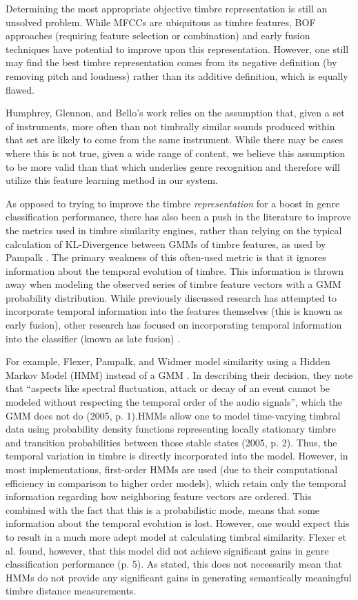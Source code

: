 \documentclass[a4paper,12pt]{report} 	%
\numberwithin{figure}{chapter}
\numberwithin{table}{chapter}
\numberwithin{equation}{chapter}
\begin{document}
\begin{flushleft}
Determining the most appropriate objective timbre representation is still an unsolved problem. While MFCCs are ubiquitous as timbre features, BOF approaches (requiring feature selection or combination) and early fusion techniques have potential to improve upon this representation. However, one still may find the best timbre representation comes from its negative definition (by removing pitch and loudness) rather than its additive definition, which is equally flawed. 

Humphrey, Glennon, and Bello's work relies on the assumption that, given a set of instruments, more often than not timbrally similar sounds produced within that set are likely to come from the same instrument. While there may be cases where this is not true, given a wide range of content, we believe this assumption to be more valid than that which underlies genre recognition and therefore will utilize this feature learning method in our system.

As opposed to trying to improve the timbre \emph{representation} for a boost in genre classification performance, there has also been a push in the literature to improve the metrics used in timbre similarity engines, rather than relying on the typical calculation of KL-Divergence between GMMs of timbre features, as used by Pampalk \cite{Pampalk:2006pr}. The primary weakness of this often-used metric is that it ignores information about the temporal evolution of timbre. This information is thrown away when modeling the observed series of timbre feature vectors with a GMM probability distribution. While previously discussed research has attempted to incorporate temporal information into the features themselves (this is known as early fusion), other research has focused on incorporating temporal information into the classifier (known as late fusion) \cite[p. 500]{Meng:2005fx}.

For example, Flexer, Pampalk, and Widmer model similarity using a Hidden Markov Model (HMM) instead of a GMM \cite{Flexer:2005sw}. In describing their decision, they note that ``aspects like spectral fluctuation, attack or decay of an event cannot be modeled without respecting the temporal order of the audio signals'', which the GMM does not do (2005, p. 1).HMMs allow one to model time-varying timbral data using probability density functions representing locally stationary timbre and transition probabilities between those stable states (2005, p. 2). Thus, the temporal variation in timbre is directly incorporated into the model. However, in most implementations, first-order HMMs are used (due to their computational efficiency in comparison to higher order models), which retain only the temporal information regarding how neighboring feature vectors are ordered. This combined with the fact that this is a probabilistic mode, means that some information about the temporal evolution is lost. However, one would expect this to result in a much more adept model at calculating timbral similarity. Flexer et al. found, however, that this model did not achieve significant gains in genre classification performance (p. 5). As stated, this does not necessarily mean that HMMs do not provide any significant gains in generating semantically meaningful timbre distance measurements.


\end{flushleft}
\end{document}
